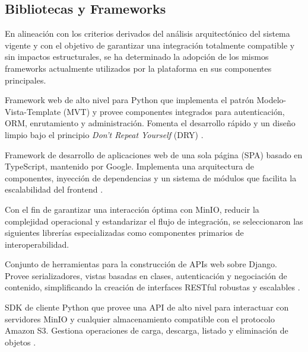 \subsection{Bibliotecas y Frameworks}

En alineación con los criterios derivados del análisis arquitectónico del sistema vigente y con el
objetivo de garantizar una integración totalmente compatible y sin impactos estructurales, se ha
determinado la adopción de los mismos frameworks actualmente utilizados por la plataforma en sus
componentes principales.

\begin{description}
\sloppy
  \item[Django v3.2.2:] Framework web de alto nivel para Python que implementa el patrón
  Modelo-Vista-Template (MVT) y provee componentes integrados para autenticación, ORM, enrutamiento
  y administración. Fomenta el desarrollo rápido y un diseño limpio bajo el principio
  \textit{Don't Repeat Yourself} (DRY) \citep{Christie2024}.

  \item[Angular v15.2.10:] Framework de desarrollo de aplicaciones web de una sola página (SPA)
  basado en TypeScript, mantenido por Google. Implementa una arquitectura de componentes, inyección
  de dependencias y un sistema de módulos que facilita la escalabilidad del frontend
  \citep{Richards2020}.
\end{description}

Con el fin de garantizar una interacción óptima con MinIO, reducir la complejidad operacional y
estandarizar el flujo de integración, se seleccionaron las siguientes librerías especializadas como
componentes primarios de interoperabilidad.

\begin{description}
\sloppy
  \item[Django Rest Framework v3.12.4:] Conjunto de herramientas para la construcción de APIs web
  sobre Django. Provee serializadores, vistas basadas en clases, autenticación y negociación de
  contenido, simplificando la creación de interfaces RESTful robustas y escalables
  \citep{Christie2024}.

  \item[MinIO Python SDK v7.2.18:] SDK de cliente Python que provee una API de alto nivel para
  interactuar con servidores MinIO y cualquier almacenamiento compatible con el protocolo Amazon S3.
  Gestiona operaciones de carga, descarga, listado y eliminación de objetos \citep{MinIO2024}.
\end{description}

